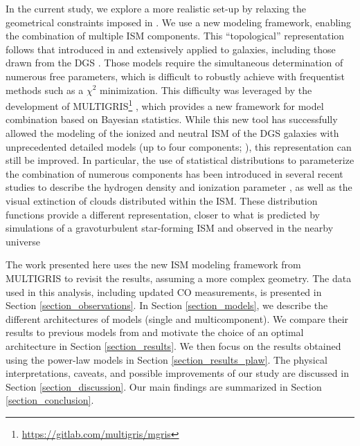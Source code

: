 \documentclass{aa}
\begin{document}
In the current study, we explore a more realistic set-up by relaxing the geometrical constraints imposed in . We use a new modeling framework, enabling the combination of multiple ISM components. This “topological” representation follows that introduced in \cite{pequignot_heating_nodate} and extensively applied to galaxies, including those drawn from the DGS \citep{2012_Cormier, polles_modeling_2019, cormier_herschel_2019, lebouteiller_neutral_2017}. Those models require the simultaneous determination of numerous free parameters, which is difficult to robustly achieve with frequentist methods such as a $\chi^2$ minimization. This difficulty was leveraged by the development of MULTIGRIS\footnote{ \href{https://gitlab.com/multigris/mgris}{https://gitlab.com/multigris/mgris}} \citep{MULTIGRIS2022}, which provides a new framework for model combination based on Bayesian statistics. 
While this new tool has successfully allowed the modeling of the ionized and neutral ISM of the DGS galaxies with unprecedented detailed models (up to four components; \citealt{LebouteillerRamambason2022, Ramambason2022}), this representation can still be improved. In particular, the use of statistical distributions to parameterize the combination of numerous components has been introduced in several recent studies to describe the hydrogen density and ionization parameter \citep{richardson_interpreting_2014,richardson_interpreting_2016, richardson_addressing_2019}, as well as the visual extinction \citep{Bisbas_2021} of clouds distributed within the ISM. These distribution functions provide a different representation, closer to what is predicted by simulations of a gravoturbulent star-forming ISM \citep[e.g.,][]{Offner_2014, Burkhart_2018, Burkhart_2019, Appel_2023} and observed in the nearby universe \citep[e.g.,][]{Brunt_2015, Lombardi_2015}

The work presented here uses the new ISM modeling framework from MULTIGRIS to revisit the  results, assuming a more complex geometry. The data used in this analysis, including updated CO measurements, is presented in Section \ref{section_observations}. In Section \ref{section_models}, we describe the different architectures of models (single and multicomponent). We compare their results to previous models from  and motivate the choice of an optimal architecture in Section \ref{section_results}. We then focus on the results obtained using the power-law models in Section \ref{section_results_plaw}. The physical interpretations, caveats, and possible improvements of our study are discussed in Section \ref{section_discussion}. Our main findings are summarized in Section \ref{section_conclusion}.
\end{document}
